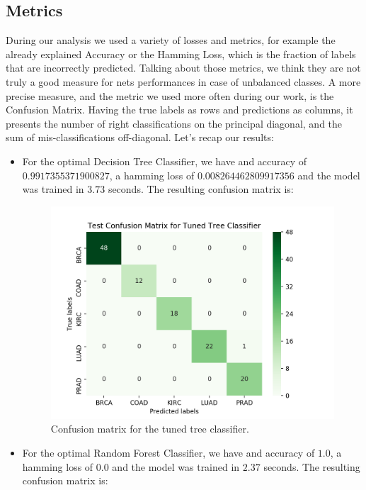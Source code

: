 \documentclass{article}
\begin{document}
\subsection{Metrics}
During our analysis we used a variety of losses and metrics, for example the already explained Accuracy or the Hamming Loss, which is the fraction of labels that are incorrectly predicted.
Talking about those metrics, we think they are not truly a good measure for nets performances in case of unbalanced classes.
A more precise measure, and the metric we used more often during our work, is the Confusion Matrix.
Having the true labels as rows and predictions as columns, it presents the number of right classifications on the principal diagonal, and the sum of mis-classifications off-diagonal. 
Let's recap our results:
\begin{itemize}
\item For the optimal Decision Tree Classifier, we have and accuracy of $0.9917355371900827 $, a hamming loss of $0.008264462809917356 $ and the model was trained in $3.73$ seconds.
The resulting confusion matrix is:

\begin{figure}[h!]
\centering
\includegraphics[width=\linewidth]{img/matrix_tree}
\caption{Confusion matrix for the tuned tree classifier.}
\label{mat_tree}
\end{figure}

\item For the optimal Random Forest Classifier, we have and accuracy of $1.0 $, a hamming loss of $0.0$ and the model was trained in $2.37$ seconds. The resulting confusion matrix is:


\end{itemize}
\end{document}
